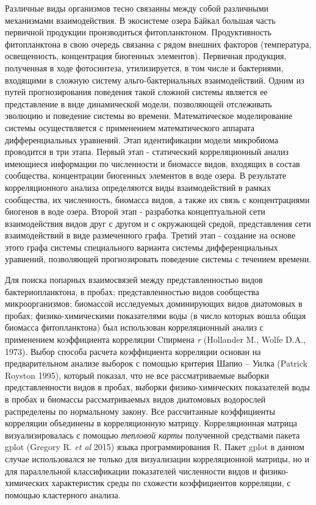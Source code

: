 \documentclass[a4paper,12pt,openany,final]{extreport}
\begin{document}
Различные виды организмов тесно связанны между собой различными
механизмами взаимодействия. В экосистеме озера Байкал большая часть
первичной продукции производиться фитопланктоном. Продуктивность
фитопланктона в свою очередь связанна с рядом внешних факторов
(температура, освещенность, концентрация биогенных элементов). Первичная
продукция, полученная в ходе фотосинтеза, утилизируется, в том числе и
бактериями, входящими в сложную систему альго-бактериальных
взаимодействий. Одним из путей прогнозирования поведения такой сложной
системы является ее представление в виде динамической модели,
позволяющей отслеживать эволюцию и поведение системы во времени.
Математическое моделирование системы осуществляется с применением
математического аппарата дифференциальных уравнений. Этап идентификации
модели микробиома проводится в три этапа. Первый этап - статический
корреляционный анализ имеющиеся информации по численности и биомассе
видов, входящих в состав сообщества, концентрации биогенных элементов в
воде озера. В результате корреляционного анализа определяются виды
взаимодействий в рамках сообщества, их численность, биомасса видов, а
также их связь с концентрациями биогенов в воде озера. Второй этап -
разработка концептуальной сети взаимодействия видов друг с другом и с
окружающей средой, представления сети взаимодействий в виде размеченного
графа. Третий этап - создание на основе этого графа системы специального
варианта системы дифференциальных уравнений, позволяющей прогнозировать
поведение системы с течением времени.

Для поиска попарных взаимосвязей между представленностью видов
бактериопланктона, в пробах; представленностью видов сообщества
микроорганизмов; биомассой исследуемых доминирующих видов диатомовых в
пробах; физико-химическими показателями воды (в число которых вошла
общая биомасса фитопланктона) был использован корреляционный анализ с
применением коэффициента корреляции Cпирмена \emph{r} (Hollander M.,
Wolfe D.A., 1973). Выбор способа расчета коэффициента корреляции основан
на предварительном анализе выборок с помощью критерия Шапио -- Уилка
(Patrick Royston 1995), который показал, что не все рассматриваемые
выборки представленности видов в пробах, выборки физико-химических
показателей воды в пробах и биомассы рассматриваемых видов диатомовых
водорослей распределены по нормальному закону. Все рассчитанные
коэффициенты корреляции объединены в корреляционную матрицу.
Корреляционная матрица визуализировалась с помощью \emph{тепловой карты}
полученной средствами пакета gplot (Gregory R. \textit{et al} 2015) языка
программирования R. Пакет gplot в данном случае использовался не
только для визуализации корреляционной матрицы, но и для параллельной
классификации показателей численности видов и физико-химических
характеристик среды по схожести коэффициентов корреляции, с помощью
кластерного анализа.
\end{document}
